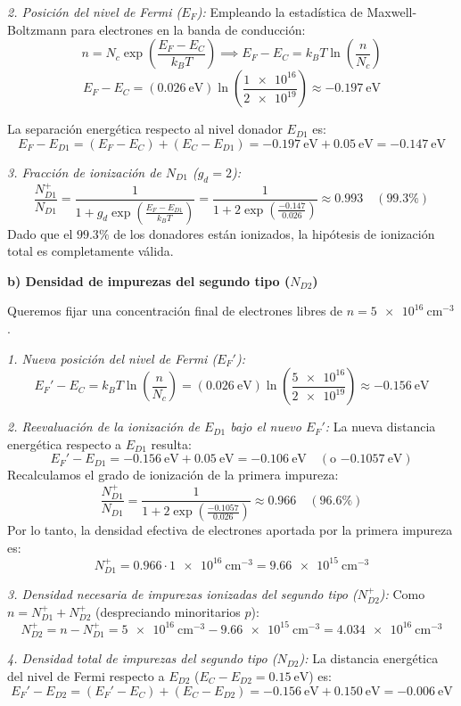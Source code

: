 \begin{problema}
\textit{2. Posición del nivel de Fermi ($E_F$):}
Empleando la estadística de Maxwell-Boltzmann para electrones en la banda de conducción:
\[
n = N_c \exp\left( \frac{E_F - E_C}{k_B T} \right) \implies E_F - E_C = k_B T \ln\left( \frac{n}{N_c} \right)
\]
\[
E_F - E_C = (\SI{0.026}{\eV}) \ln\left( \frac{\num{1e16}}{\num{2e19}} \right) \approx \SI{-0.197}{\eV}
\]

La separación energética respecto al nivel donador $E_{D1}$ es:
\[
E_F - E_{D1} = (E_F - E_C) + (E_C - E_{D1}) = \SI{-0.197}{\eV} + \SI{0.05}{\eV} = \SI{-0.147}{\eV}
\]

\textit{3. Fracción de ionización de $N_{D1}$ ($g_d = 2$):}
\[
\frac{N_{D1}^+}{N_{D1}} = \frac{1}{1 + g_d \exp\left( \frac{E_F - E_{D1}}{k_B T} \right)} = \frac{1}{1 + 2 \exp\left( \frac{-0.147}{0.026} \right)} \approx 0.993 \quad (99.3\%)
\]
Dado que el $99.3\%$ de los donadores están ionizados, la hipótesis de ionización total es completamente válida.

\textbf{b) Densidad de impurezas del segundo tipo ($N_{D2}$)}

Queremos fijar una concentración final de electrones libres de $n = \SI{5e16}{\cm^{-3}}$.

\textit{1. Nueva posición del nivel de Fermi ($E_F'$):}
\[
E_F' - E_C = k_B T \ln\left( \frac{n}{N_c} \right) = (\SI{0.026}{\eV}) \ln\left( \frac{\num{5e16}}{\num{2e19}} \right) \approx \SI{-0.156}{\eV}
\]

\textit{2. Reevaluación de la ionización de $E_{D1}$ bajo el nuevo $E_F'$:}
La nueva distancia energética respecto a $E_{D1}$ resulta:
\[
E_F' - E_{D1} = \SI{-0.156}{\eV} + \SI{0.05}{\eV} = \SI{-0.106}{\eV} \quad (\text{o }\SI{-0.1057}{\eV})
\]
Recalculamos el grado de ionización de la primera impureza:
\[
\frac{N_{D1}^+}{N_{D1}} = \frac{1}{1 + 2 \exp\left( \frac{-0.1057}{0.026} \right)} \approx 0.966 \quad (96.6\%)
\]
Por lo tanto, la densidad efectiva de electrones aportada por la primera impureza es:
\[
N_{D1}^+ = 0.966 \cdot \SI{1e16}{\cm^{-3}} = \SI{9.66e15}{\cm^{-3}}
\]

\textit{3. Densidad necesaria de impurezas ionizadas del segundo tipo ($N_{D2}^+$):}
Como $n = N_{D1}^+ + N_{D2}^+$ (despreciando minoritarios $p$):
\[
N_{D2}^+ = n - N_{D1}^+ = \SI{5e16}{\cm^{-3}} - \SI{9.66e15}{\cm^{-3}} = \SI{4.034e16}{\cm^{-3}}
\]

\textit{4. Densidad total de impurezas del segundo tipo ($N_{D2}$):}
La distancia energética del nivel de Fermi respecto a $E_{D2}$ ($E_C - E_{D2} = \SI{0.15}{\eV}$) es:
\[
E_F' - E_{D2} = (E_F' - E_C) + (E_C - E_{D2}) = \SI{-0.156}{\eV} + \SI{0.150}{\eV} = \SI{-0.006}{\eV}
\]


\end{problema}

